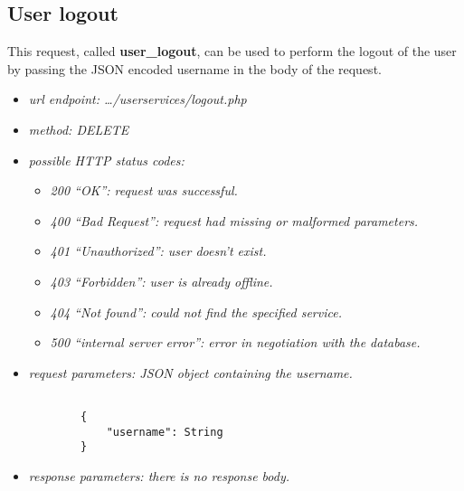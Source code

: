 \documentclass[a4paper,12pt]{article}
\begin{document}
        \clearpage
        \subsection[User logout]{User logout}

            \vspace{10pt}

            This request, called \textbf{user\_logout}, can be used to perform the logout of the user by passing the JSON encoded username in the body of the request.

            \begin{itemize}

                \item \textit{url endpoint: \ldots/userservices/logout.php}
                \item \textit{method: DELETE}
                \item \textit{possible HTTP status codes:}

                    \begin{itemize}

                        \item \textit{200 ``OK'': request was successful.}
                        \item \textit{400 ``Bad Request'': request had missing or malformed parameters.}
                        \item \textit{401 ``Unauthorized'': user doesn't exist.}
                        \item \textit{403 ``Forbidden'': user is already offline.}
                        \item \textit{404 ``Not found'': could not find the specified service.}
                        \item \textit{500 ``internal server error'': error in negotiation with the database.}

                    \end{itemize}

                \item \textit{request parameters: JSON object containing the username.}
    
    \begin{verbatim}
                        
        {
            "username": String
        }

    \end{verbatim}

                \item \textit{response parameters: there is no response body.}

            \end{itemize}
\end{document}
